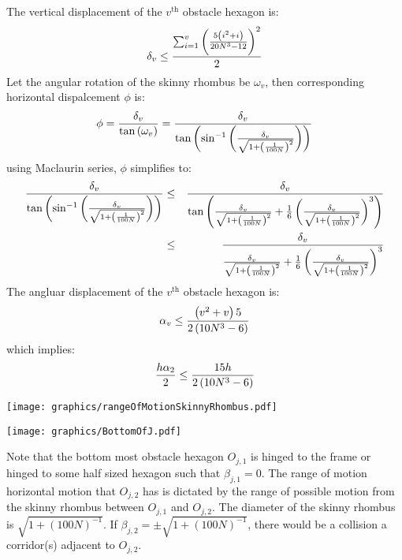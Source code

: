 The vertical displacement of the $v^\text{th}$ obstacle hexagon is:
$$\delta_v \leq \frac{\sum_{i=1}^v  \left(  \frac{5\left( i^2+i \right)}{20N^3-12} \right)^2}{2}$$
Let the angular rotation of the skinny rhombus be $\omega_v$, then corresponding horizontal dispalcement $\phi$ is:
$$\phi = \frac{\delta_v}{\tan\left( \omega_v \right)}=\frac{\delta_v}{\tan\left( \sin^{-1} \left( \frac{\delta_v}{\sqrt{1+ \left( \frac{1}{100N} \right)^2}} \right) \right)}$$
using Maclaurin series, $\phi$ simplifies to:
\begin{eqnarray*}
\frac{\delta_v}{\tan\left( \sin^{-1} \left( \frac{\delta_v}{\sqrt{1+ \left( \frac{1}{100N} \right)^2}} \right) \right)}&\leq&\frac{\delta_v}{\tan\left(  \frac{\delta_v}{\sqrt{1+ \left( \frac{1}{100N} \right)^2}}     + \frac{1}{6} \left( \frac{\delta_v}{\sqrt{1+ \left( \frac{1}{100N} \right)^2}} \right)^3 \right)}\\
&\leq& \frac{\delta_v}{ \frac{\delta_v}{\sqrt{1+ \left( \frac{1}{100N} \right)^2}}     + \frac{1}{6} \left( \frac{\delta_v}{\sqrt{1+ \left( \frac{1}{100N} \right)^2}} \right)^3}
\end{eqnarray*}
The angluar displacement of the $v^\text{th}$ obstacle hexagon is:
$$\alpha_v \leq \frac{\left( v^2 + v \right)5}{2\left( 10N^3-6 \right)}$$
which implies:
$$\frac{h\alpha_2 }{2} \leq \frac{15h}{2\left( 10N^3-6 \right)}$$

\begin{minipage}{\linewidth}
\begin{center}
\texttt{[image: graphics/rangeOfMotionSkinnyRhombus.pdf]}
\label{fig:rangeOfMotionSkinnyRhombus.pdf}
\end{center}
\end{minipage}

\begin{minipage}{\linewidth}
\begin{center}
\texttt{[image: graphics/BottomOfJ.pdf]}
\label{fig:BottomOfJ.pdf}
\end{center}
\end{minipage}

Note that the bottom most obstacle hexagon $O_{j,1}$ is hinged to the frame or hinged to some half sized hexagon such that $\beta_{j,1} = 0$.  
The range of motion horizontal motion that $O_{j,2}$ has is dictated by the range of possible motion from the skinny rhombus between $O_{j,1}$ and $O_{j,2}$.
The diameter of the skinny rhombus is $\sqrt{1+(100N)^{-1}}$.  
If $\beta_{j,2} = \pm \sqrt{1+(100N)^{-1}}$, there would be a collision a  corridor(s) adjacent to $O_{j,2}$.  

